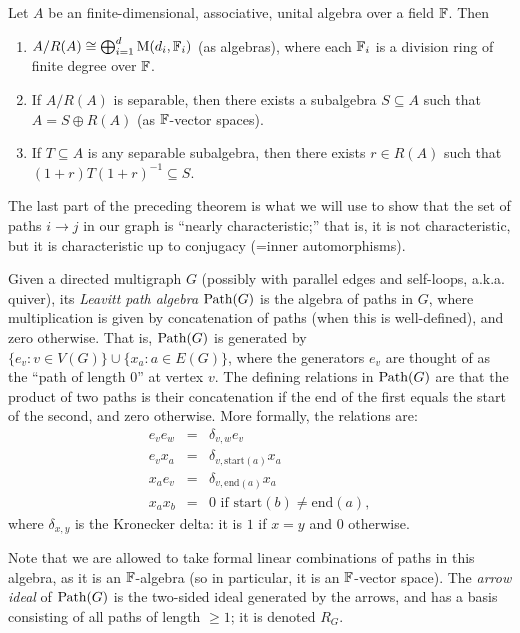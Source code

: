 \documentclass[11pt]{article}
\begin{document}
\begin{theorem} \label{thm:WM}
Let $A$ be an finite-dimensional, associative, unital algebra over a field $\mathbb{F}$. Then 
\begin{enumerate}
\item $A / R(A) \cong \bigoplus_{i=1}^d \mathrm{M}(d_i,\mathbb{F}_i)$ (as algebras), where each 
$\mathbb{F}_i$ is a division ring of finite degree over $\mathbb{F}$. 
\item If $A/R(A)$ is separable, then there exists a subalgebra $S \subseteq A$ such that $A = S \oplus R(A)$ (as $\mathbb{F}$-vector spaces).
\item \label{thm:WM:conj}If $T \subseteq A$ is any separable subalgebra, then there exists $r \in R(A)$ such that $(1+r) T (1+r)^{-1} \subseteq S$.
\end{enumerate}
\end{theorem}
The last part of the preceding theorem is what we will use to show that the set of paths $i \to j$ in our graph is ``nearly characteristic;'' that is, it is not characteristic, but it is characteristic up to conjugacy (=inner automorphisms).

\begin{definition}
Given a directed multigraph $G$ (possibly with parallel edges and self-loops, a.k.a. quiver), its \emph{Leavitt path algebra} $\text{Path}(G)$ is the algebra of paths in $G$, where multiplication is given by concatenation of paths (when this is well-defined), and zero otherwise. That is, $\text{Path}(G)$ is generated by $\{e_v : v \in V(G)\} \cup \{x_a : a \in E(G)\}$, where the generators $e_v$ are thought of as the ``path of length $0$'' at vertex $v$. The defining relations in $\text{Path}(G)$ are that the product of two paths is their concatenation if the end of the first equals the start of the second, and zero otherwise. More formally, the relations are:
\begin{eqnarray*}
e_v e_w & = & \delta_{v,w} e_v \\
e_v x_{a} & = & \delta_{v,\text{start}(a)} x_{a} \\
x_{a} e_{v} & = & \delta_{v,\text{end}(a)} x_{a} \\
x_a x_b & = & 0 \text{ if } \text{start}(b) \neq \text{end}(a),
\end{eqnarray*}
where $\delta_{x,y}$ is the Kronecker delta: it is $1$ if $x=y$ and $0$ otherwise.
\end{definition}
Note that we are allowed to take formal linear combinations of paths in this algebra, as it is an $\mathbb{F}$-algebra (so in particular, it is an $\mathbb{F}$-vector space). The \emph{arrow ideal} of $\text{Path}(G)$ is the two-sided ideal generated by the arrows, and has a basis consisting of all paths of length $\geq 1$; it is denoted $R_G$.
\end{document}
